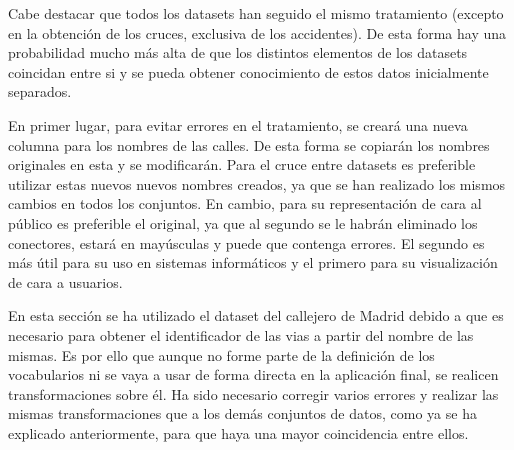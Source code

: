 Cabe destacar que todos los datasets han seguido el mismo tratamiento (excepto en la obtención de los cruces, exclusiva de los accidentes). De esta forma hay una probabilidad mucho más alta de que los distintos elementos de los datasets coincidan entre si y se pueda obtener conocimiento de estos datos inicialmente separados.

En primer lugar, para evitar errores en el tratamiento, se creará una nueva columna para los nombres de las calles. De esta forma se copiarán los nombres originales en esta y se modificarán. Para el cruce entre datasets es preferible utilizar estas nuevos nuevos nombres creados, ya que se han realizado los mismos cambios en todos los conjuntos. En cambio, para su representación de cara al público es preferible el original, ya que al segundo se le habrán eliminado los conectores, estará en mayúsculas y puede que contenga errores. El segundo es más útil para su uso en sistemas informáticos y el primero para su visualización de cara a usuarios.

En esta sección se ha utilizado el dataset del callejero de Madrid \cite{datosmadrid_callejero} debido a que es necesario para obtener el identificador de las vias a partir del nombre de las mismas. Es por ello que aunque no forme parte de la definición de los vocabularios ni se vaya a usar de forma directa en la aplicación final, se realicen transformaciones sobre él. Ha sido necesario corregir varios errores y realizar las mismas transformaciones que a los demás conjuntos de datos, como ya se ha explicado anteriormente, para que haya una mayor coincidencia entre ellos.
